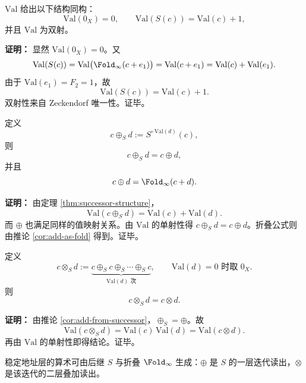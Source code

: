 \begin{theorem}[后继结构同构]\label{thm:successor-structure}
\(\mathrm{Val}\) 给出以下结构同构：
\[
\mathrm{Val}(0_X)=0,\qquad
\mathrm{Val}(S(c))=\mathrm{Val}(c)+1,
\]
并且 \(\mathrm{Val}\) 为双射。
\end{theorem}

\textbf{证明：}
显然 \(\mathrm{Val}(0_X)=0\)。又
\[
\mathrm{Val}(S(c))
=\mathrm{Val}\bigl(\Fold_\infty(c+e_1)\bigr)
=\mathrm{Val}(c+e_1)
=\mathrm{Val}(c)+\mathrm{Val}(e_1).
\]
由于 \(\mathrm{Val}(e_1)=F_2=1\)，故
\[
\mathrm{Val}(S(c))=\mathrm{Val}(c)+1.
\]
双射性来自 Zeckendorf 唯一性。证毕。

\begin{corollary}[加法由后继迭代给出]\label{cor:add-from-successor}
定义
\[
c\oplus_S d:=S^{\circ\,\mathrm{Val}(d)}(c),
\]
则
\[
c\oplus_S d=c\oplus d,
\]
并且
\[
c\oplus d=\Fold_\infty(c+d).
\]
\end{corollary}

\textbf{证明：}
由定理 \ref{thm:successor-structure}，
\[
\mathrm{Val}(c\oplus_S d)=\mathrm{Val}(c)+\mathrm{Val}(d).
\]
而 \(\oplus\) 也满足同样的值映射关系。由 \(\mathrm{Val}\) 的单射性得 \(c\oplus_S d=c\oplus d\)。折叠公式则由推论 \ref{cor:add-as-fold} 得到。证毕。

\begin{theorem}[乘法由后继迭代内生]\label{thm:mul-from-successor}
定义
\[
c\otimes_S d
:=
\underbrace{c\oplus_S c\oplus_S\cdots\oplus_S c}_{\mathrm{Val}(d)\text{ 次}},
\qquad
\mathrm{Val}(d)=0\text{ 时取 }0_X.
\]
则
\[
c\otimes_S d=c\otimes d.
\]
\end{theorem}

\textbf{证明：}
由推论 \ref{cor:add-from-successor}，\(\oplus_S=\oplus\)。故
\[
\mathrm{Val}(c\otimes_S d)=\mathrm{Val}(c)\,\mathrm{Val}(d)=\mathrm{Val}(c\otimes d).
\]
再由 \(\mathrm{Val}\) 的单射性即得结论。证毕。

\begin{corollary}[极简原语集]\label{cor:primitive-minimal-successor}
稳定地址层的算术可由后继 \(S\) 与折叠 \(\Fold_\infty\) 生成：\(\oplus\) 是 \(S\) 的一层迭代读出，\(\otimes\) 是该迭代的二层叠加读出。
\end{corollary}

